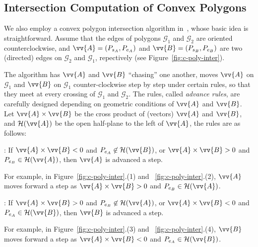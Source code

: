 \subsection{Intersection Computation of Convex Polygons}
\label{subsec-cpi}

We also employ a convex polygon intersection algorithm in~\cite{ORourke:Intersection}, whose basic idea is straightforward.
Assume \kwlog that the edges of polygons $\mathcal{G}_1$ and $\mathcal{G}_2$ are oriented counterclockwise, and $\vv{A} = (P_{s_A}, P_{e_A})$ and $\vv{B} = (P_{s_B}, P_{e_B})$ are two (directed) edges on $\mathcal{G}_2$ and $\mathcal{G}_1$, repectively (see Figure~\ref{fig:c-poly-inter}).

The algorithm has $\vv{A}$ and $\vv{B}$ ``chasing'' one another, \ie moves $\vv{A}$ on $\mathcal{G}_1$ and $\vv{B}$ on $\mathcal{G}_1$ counter-clockwise step by step under certain rules, so that they meet at every crossing of $\mathcal{G}_1$ and $\mathcal{G}_2$.
%
The rules, called \emph{advance rules}, are carefully designed depending on geometric conditions of $\vv{A}$ and $\vv{B}$.
Let $\vv{A} \times \vv{B}$ be the cross product of (vectors) $\vv{A}$ and $\vv{B}$, and $\mathcal{H}(\vv{A})$ be the open half-plane to the left of $\vv{A}$, the rules are as follows:

: If $\vv{A} \times \vv{B} < 0$ and $P_{e_A} \not \in \mathcal{H}(\vv{B})$, or $\vv{A} \times \vv{B} > 0$ and $P_{e_B} \in \mathcal{H}(\vv{A})$, then $\vv{A}$ is advanced a step.

For example, in Figure~\ref{fig:c-poly-inter}.(1) and ~\ref{fig:c-poly-inter}.(2), $\vv{A}$ moves forward a step as  $\vv{A} \times \vv{B} > 0$ and $P_{e_B} \in \mathcal{H}(\vv{A})$.

: If $\vv{A} \times \vv{B} > 0$ and $P_{e_B} \not \in \mathcal{H}(\vv{A})$, or $\vv{A} \times \vv{B} < 0$ and $P_{e_A} \in \mathcal{H}(\vv{B})$, then  $\vv{B}$ is advanced a step.

For example, in Figure~\ref{fig:c-poly-inter}.(3) and ~\ref{fig:c-poly-inter}.(4), $\vv{B}$ moves forward a step as $\vv{A} \times \vv{B} < 0$ and $P_{e_A} \in \mathcal{H}(\vv{B})$.



